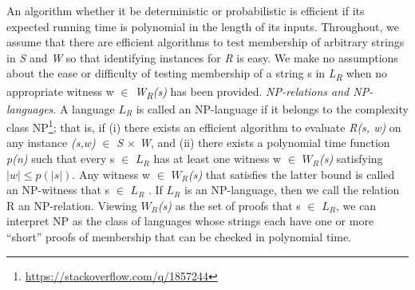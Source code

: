 \documentclass[a4paper]{article}
\newcommand{\quotes}[1]{``#1''}
\begin{document}
\newline
An algorithm whether it be deterministic or probabilistic is efficient if its expected running time is polynomial in the length of its inputs.
\newline
Throughout, we assume that there are efficient algorithms to test membership of arbitrary strings in \textit{S} and \textit{W} so that identifying instances for \textit{R} is easy. 
\newline
We make no assumptions about the ease or difficulty of testing membership of a string s in \textit{L\textsubscript{R}} when no appropriate witness w $\in$ \textit{W\textsubscript{R}(s)} has been provided.
\newline
\newline
\textit{NP-relations and NP-languages}. A language \textit{$L_R$} is called an NP-language if it belongs to the complexity class NP\footnote{\url{https://stackoverflow.com/q/1857244}}; that is, if (i) there exists an efficient algorithm to evaluate \textit{R(s, w)} on any instance \textit{(s,w)} $\in$ \textit{S $\times$ W}, and (ii) there exists a polynomial time function \emph{p(n)} such that every s $\in$ \textit{$L_R$} has at least one witness w $\in$ \textit{$W_R$(s)} satisfying $|w|\leq p(|s|)$.
Any witness w $\in$ \textit{$W_R$(s)} that satisfies the latter bound is called an NP-witness that s $\in$ \textit{$L_R$} . If \textit{$L_R$} is an NP-language, then we call the relation R an NP-relation. Viewing \textit{$W_R$(s)} as the set of proofs that s $\in$ \textit{$L_R$}, we can interpret NP as the class of languages whose strings each have one or more \quotes{short} proofs of membership that can be checked in polynomial time.
\newline
\newline
\end{document}
